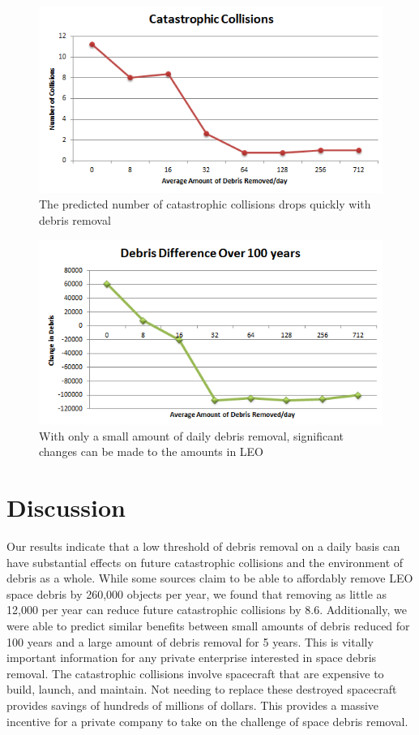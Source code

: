 \documentclass[pre,12pt]{revtex4-1}
\begin{document}
\begin{figure}[h!]
	\includegraphics[width=.75\textwidth]{"Figures/results_collisions"}
	\caption{The predicted number of catastrophic collisions drops quickly with debris removal}
	\label{fig:reducecol}
\end{figure}
\begin{figure}[h!]
	\includegraphics[width=.75\textwidth]{"Figures/results_difference"}
	\caption{With only a small amount of daily debris removal, significant changes can be made to the amounts in LEO}
	\label{fig:diffdebris}
\end{figure}


\section{Discussion}\label{Discussion}

Our results indicate that a low threshold of debris removal on a daily basis can have substantial effects on future catastrophic collisions and the environment of debris as a whole. While some sources claim to be able to affordably remove LEO space debris by 260,000 objects per year, we found that removing as little as 12,000 per year can reduce future catastrophic collisions by 8.6. Additionally, we were able to predict similar benefits between small amounts of debris reduced for 100 years and a large amount of debris removal for 5 years. This is vitally important information for any private enterprise interested in space debris removal. The catastrophic collisions involve spacecraft that are expensive to build, launch, and maintain. Not needing to replace these destroyed spacecraft provides savings of hundreds of millions of dollars. This provides a massive incentive for a private company to take on the challenge of space debris removal. 
\end{document}
